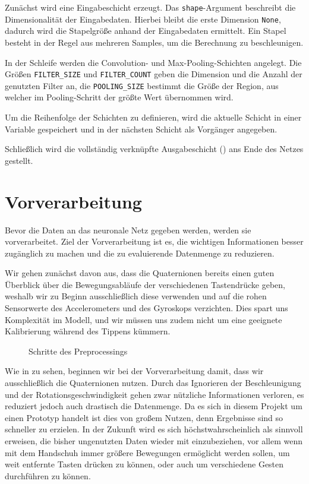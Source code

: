 Zunächst wird eine Eingabeschicht erzeugt. Das \texttt{shape}-Argument beschreibt die Dimensionalität der Eingabedaten. Hierbei bleibt die erste Dimension \texttt{None}, dadurch wird die Stapelgröße anhand der Eingabedaten ermittelt. Ein Stapel besteht in der Regel aus mehreren Samples, um die Berechnung zu beschleunigen.

In der Schleife werden die Convolution- und Max-Pooling-Schichten angelegt. Die Größen \texttt{FILTER\_SIZE} und \texttt{FILTER\_COUNT} geben die Dimension und die Anzahl der genutzten Filter an, die \texttt{POOLING\_SIZE} bestimmt die Größe der Region, aus welcher im Pooling-Schritt der größte Wert übernommen wird.

Um die Reihenfolge der Schichten zu definieren, wird die aktuelle Schicht in einer Variable gespeichert und in der nächsten Schicht als Vorgänger angegeben.

Schließlich wird die vollständig verknüpfte Ausgabeschicht () ans Ende des Netzes gestellt.

\section{Vorverarbeitung}

Bevor die Daten an das neuronale Netz gegeben werden, werden sie vorverarbeitet. Ziel der Vorverarbeitung ist es, die wichtigen Informationen besser zugänglich zu machen und die zu evaluierende Datenmenge zu reduzieren.

Wir gehen zunächst davon aus, dass die Quaternionen bereits einen guten Überblick über die Bewegungsabläufe der verschiedenen Tastendrücke geben, weshalb wir zu Beginn ausschließlich diese verwenden und auf die rohen Sensorwerte des Accelerometers und des Gyroskops verzichten. Dies spart uns Komplexität im Modell, und wir müssen uns zudem nicht um eine geeignete Kalibrierung während des Tippens kümmern.

\begin{figure}[htb]
    \centering
    
    \caption{Schritte des Preprocessings}
\end{figure}

Wie in  zu sehen, beginnen wir bei der Vorverarbeitung damit, dass wir ausschließlich die Quaternionen nutzen. Durch das Ignorieren der Beschleunigung und der Rotationsgeschwindigkeit gehen zwar nützliche Informationen verloren, es reduziert jedoch auch drastisch die Datenmenge. Da es sich in diesem Projekt um einen Prototyp handelt ist dies von großem Nutzen, denn Ergebnisse sind so schneller zu erzielen. In der Zukunft wird es sich höchstwahrscheinlich als sinnvoll erweisen, die bisher ungenutzten Daten wieder mit einzubeziehen, vor allem wenn mit dem Handschuh immer größere Bewegungen ermöglicht werden sollen, um weit entfernte Tasten drücken zu können, oder auch um verschiedene Gesten durchführen zu können.


